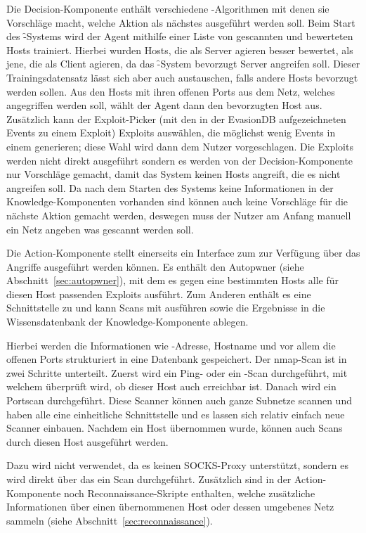 Die Decision-Komponente enthält verschiedene -Algorithmen mit denen sie
Vorschläge macht, welche Aktion als nächstes ausgeführt werden soll. Beim Start
des \f-Systems wird der Agent mithilfe einer Liste von gescannten und bewerteten
Hosts trainiert. Hierbei wurden Hosts, die als Server agieren besser bewertet, als
jene, die als Client agieren, da das \f-System bevorzugt Server angreifen soll.
Dieser Trainingsdatensatz lässt sich aber auch austauschen, falls andere Hosts
bevorzugt werden sollen. Aus den Hosts mit ihren offenen Ports aus dem Netz,
welches angegriffen werden soll, wählt der Agent dann den bevorzugten Host aus.
Zusätzlich kann der Exploit-Picker (mit den in der EvasionDB aufgezeichneten
Events zu einem Exploit) Exploits auswählen, die möglichst wenig Events in einem
 generieren; diese Wahl wird dann dem Nutzer vorgeschlagen. Die Exploits
werden nicht direkt ausgeführt sondern es werden von der Decision-Komponente nur
Vorschläge gemacht, damit das System keinen Hosts angreift, die es nicht angreifen
soll. Da nach dem Starten des Systems keine Informationen in der Knowledge-Komponenten
vorhanden sind können auch keine Vorschläge für die nächste Aktion gemacht werden,
deswegen muss der Nutzer am Anfang manuell ein Netz angeben was gescannt werden soll.

Die Action-Komponente stellt einerseits ein Interface zum  zur
Verfügung über das Angriffe ausgeführt werden können. Es enthält den Autopwner
(siehe Abschnitt~\ref{sec:autopwner}), mit dem es gegen eine bestimmten Hosts
alle für diesen Host passenden Exploits ausführt. Zum Anderen enthält es eine
Schnittstelle zu  und kann Scans mit  ausführen sowie die
Ergebnisse in die Wissensdatenbank der Knowledge-Komponente ablegen.

Hierbei werden die Informationen wie -Adresse, Hostname und vor
allem die offenen Ports strukturiert in eine Datenbank gespeichert.
Der nmap-Scan ist in zwei Schritte unterteilt.  Zuerst wird ein Ping- oder
ein -Scan durchgeführt, mit welchem überprüft wird, ob dieser
Host auch erreichbar ist. Danach wird ein Portscan durchgeführt.
Diese Scanner können auch ganze Subnetze scannen und haben alle eine
einheitliche Schnittstelle und es lassen sich relativ einfach neue
Scanner einbauen. Nachdem ein Host übernommen wurde, können auch Scans
durch diesen Host ausgeführt werden.

Dazu wird nicht  verwendet, da es keinen SOCKS-Proxy unterstützt,
sondern es wird direkt über das  ein Scan durchgeführt.
Zusätzlich sind in der Action-Komponente noch Reconnaissance-Skripte
enthalten, welche zusätzliche Informationen über einen übernommenen
Host oder dessen umgebenes Netz sammeln (siehe Abschnitt~\ref{sec:reconnaissance}).

